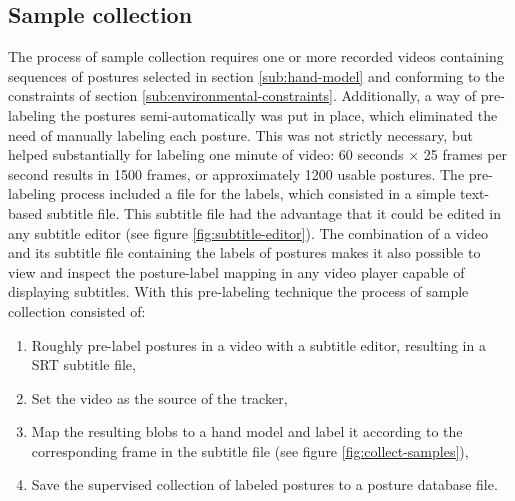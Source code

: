 \subsection{Sample collection}
\label{sub:sample-collection}

The process of sample collection requires one or more recorded videos containing sequences of postures selected in section \ref{sub:hand-model} and conforming to the constraints of section \ref{sub:environmental-constraints}. Additionally, a way of pre-labeling the postures semi-automatically was put in place, which eliminated the need of manually labeling each posture. This was not strictly necessary, but helped substantially for labeling one minute of video: 60 seconds $\times$ 25 frames per second results in 1500 frames, or approximately 1200 usable postures. The pre-labeling process included a file for the labels, which consisted in a simple text-based subtitle file. This subtitle file had the advantage that it could be edited in any subtitle editor (see figure \ref{fig:subtitle-editor}). The combination of a video and its subtitle file containing the labels of postures makes it also possible to view and inspect the posture-label mapping in any video player capable of displaying subtitles. With this pre-labeling technique the process of sample collection consisted of:

\begin{enumerate}
\item Roughly pre-label postures in a video with a subtitle editor, resulting in a SRT subtitle file,
\item Set the video as the source of the tracker,
\item Map the resulting blobs to a hand model and label it according to the corresponding frame in the subtitle file (see figure \ref{fig:collect-samples}),
\item Save the supervised collection of labeled postures to a posture database file.
\end{enumerate}

